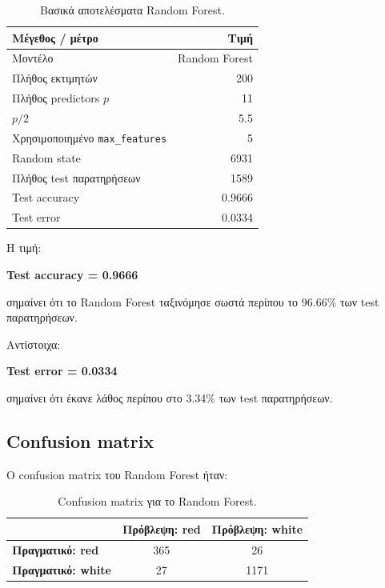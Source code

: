 \documentclass[12pt,a4paper]{article}
\newcommand{\code}[1]{\texttt{\textenglish{#1}}}
\begin{document}
\begin{table}[H]
\centering
\caption{Βασικά αποτελέσματα Random Forest.}
\begin{tabular}{lr}
\toprule
\textbf{Μέγεθος / μέτρο} & \textbf{Τιμή} \\
\midrule
Μοντέλο & Random Forest \\
Πλήθος εκτιμητών & 200 \\
Πλήθος predictors $p$ & 11 \\
$p/2$ & 5.5 \\
Χρησιμοποιημένο \code{max\_features} & 5 \\
Random state & 6931 \\
Πλήθος test παρατηρήσεων & 1589 \\
Test accuracy & 0.9666 \\
Test error & 0.0334 \\
\bottomrule
\end{tabular}
\end{table}

Η τιμή:

\begin{center}
\textbf{Test accuracy = 0.9666}
\end{center}

σημαίνει ότι το Random Forest ταξινόμησε σωστά περίπου το 96.66\% των test
παρατηρήσεων.

Αντίστοιχα:

\begin{center}
\textbf{Test error = 0.0334}
\end{center}

σημαίνει ότι έκανε λάθος περίπου στο 3.34\% των test παρατηρήσεων.

\subsection{Confusion matrix}

Ο confusion matrix του Random Forest ήταν:

\begin{table}[H]
\centering
\caption{Confusion matrix για το Random Forest.}
\begin{tabular}{lcc}
\toprule
& \textbf{Πρόβλεψη: red} & \textbf{Πρόβλεψη: white} \\
\midrule
\textbf{Πραγματικό: red} & 365 & 26 \\
\textbf{Πραγματικό: white} & 27 & 1171 \\
\bottomrule
\end{tabular}
\end{table}
\end{document}
